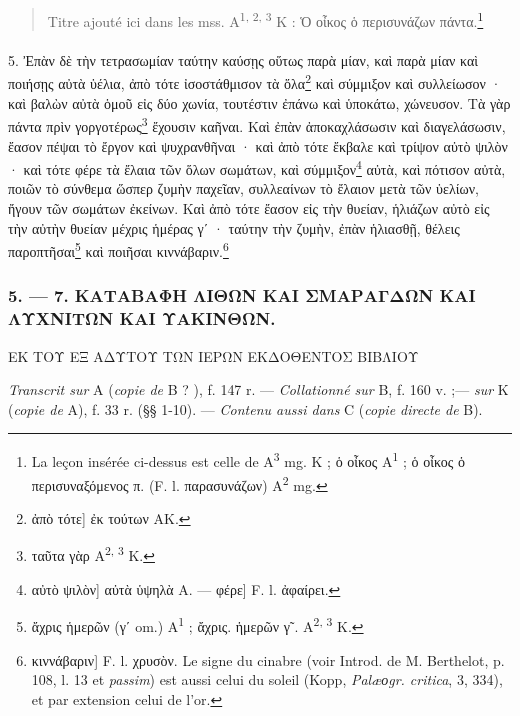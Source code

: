 \documentclass[a4paper, 11pt, oneside, polutonikogreek, french]{article}
\begin{document}
\begin{quotation}
Titre ajouté ici dans les mss. A\textsuperscript{1, 2, 3}  K : Ὁ οἶκος ὁ περισυνάζων πάντα.\footnote{La leçon insérée ci-dessus est celle de A\textsuperscript{3} mg. K ; ὁ οἶκος A\textsuperscript{1} ; ὁ οἶκος ὁ περισυναξόμενος π. (F. l. παρασυνάζων) A\textsuperscript{2} mg.}
\end{quotation}
\paragraph{}
5. Ἐπὰν δὲ τὴν τετρασωμίαν ταύτην καύσῃς οὕτως παρὰ μίαν, καὶ παρὰ μίαν καὶ ποιήσῃς αὐτὰ ὑέλια, ἀπὸ τότε ἰσοστάθμισον τὰ ὅλα\footnote{ἀπὸ τότε] ἐκ τούτων AK.} καὶ σύμμιξον καὶ συλλείωσον · καὶ βαλὼν αὐτὰ ὁμοῦ εἰς δύο χωνία, τουτέστιν ἐπάνω καὶ ὑποκάτω, χώνευσον. Τὰ γὰρ πάντα πρὶν γοργοτέρως\footnote{ταῦτα γὰρ A\textsuperscript{2, 3} K.} ἔχουσιν καῆναι. Καὶ ἐπὰν ἀποκαχλάσωσιν καὶ διαγελάσωσιν, ἔασον πέψαι τὸ ἔργον καὶ ψυχρανθῆναι · καὶ ἀπὸ τότε ἔκβαλε καὶ τρίψον αὐτὸ ψιλὸν · καὶ τότε φέρε τὰ ἔλαια τῶν ὅλων σωμάτων, καὶ σύμμιξον\footnote{αὐτὸ ψιλὸν] αὐτὰ ὑψηλὰ A. --- φέρε] F. l. ἀφαίρει.} αὐτὰ, καὶ πότισον αὐτὰ, ποιῶν τὸ σύνθεμα ὥσπερ ζυμὴν παχεῖαν, συλλεαίνων τὸ ἔλαιον μετὰ τῶν ὑελίων, ἤγουν τῶν σωμάτων ἐκείνων. Καὶ ἀπὸ τότε ἔασον εἰς τὴν θυείαν, ἡλιάζων αὐτὸ εἰς τὴν αὐτὴν θυείαν μέχρις ἡμέρας γʹ · ταύτην τὴν ζυμὴν, ἐπὰν ἡλιασθῇ, θέλεις παροπτῆσαι\footnote{ἄχρις ἡμερῶν (γʹ om.) A\textsuperscript{1} ; ἄχρις. ἡμερῶν γ῀. A\textsuperscript{2, 3} K.} καὶ ποιῆσαι κιννάβαριν.\footnote{κιννάβαριν] F. l. χρυσὸν. Le signe du cinabre (voir Introd. de M. Berthelot, p. 108, l. 13 et \emph{passim}) est aussi celui du soleil (Kopp, \emph{Palæοgr. critica}, 3, 334), et par extension celui de l'or.}

\bigskip
\centerline{\EightStarTaper}
\centerline{\EightStarTaper\EightStarTaper}
\bigskip

\subsubsection{5. --- 7. ΚΑΤΑΒΑΦΗ ΛΙΘΩΝ ΚΑΙ ΣΜΑΡΑΓΔΩΝ ΚΑΙ ΛΥΧΝΙΤΩΝ ΚΑΙ ΥΑΚΙΝΘΩΝ.}

ΕΚ ΤΟΥ ΕΞ ΑΔΥΤΟΥ ΤΩΝ ΙΕΡΩΝ ΕΚΔΟΘΕΝΤΟΣ ΒΙΒΛΙΟΥ

\emph{Transcrit sur} A (\emph{copie de} B ? ), f. 147 r. --- \emph{Collationné sur} B, f. 160 v. ;--- \emph{sur} K (\emph{copie de} A), f. 33 r. (§§ 1-10). --- \emph{Contenu aussi dans} C (\emph{copie directe de} B).

\bigskip
\end{document}
